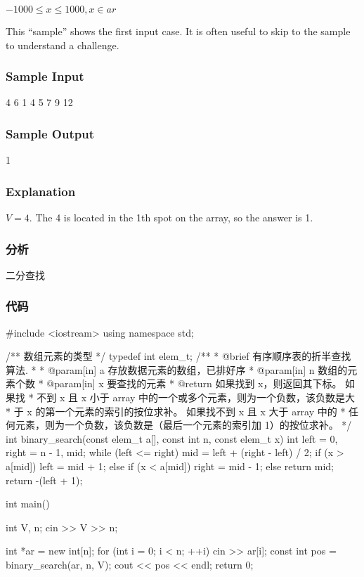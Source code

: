 $-1000 \leq x \leq 1000 , x \in ar$

{This “sample” shows the first input case. It is often useful to skip to the sample to understand a challenge. }


\subsubsection{Sample Input}
\begin{Code}
4
6
1 4 5 7 9 12
\end{Code}


\subsubsection{Sample Output}
\begin{Code}
1
\end{Code}


\subsubsection{Explanation}
$V = 4$. The 4 is located in the 1th spot on the array, so the answer is 1.


\subsubsection{分析}
二分查找


\subsubsection{代码}
\begin{Code}
#include <iostream>
using namespace std;

/** 数组元素的类型 */
typedef int elem_t;
/**
* @brief 有序顺序表的折半查找算法.
*
* @param[in] a 存放数据元素的数组，已排好序
* @param[in] n 数组的元素个数
* @param[in] x 要查找的元素
* @return 如果找到 x，则返回其下标。 如果找
* 不到 x 且 x 小于 array 中的一个或多个元素，则为一个负数，该负数是大
* 于 x 的第一个元素的索引的按位求补。 如果找不到 x 且 x 大于 array 中的
* 任何元素，则为一个负数，该负数是（最后一个元素的索引加 1）的按位求补。
*/
int binary_search(const elem_t a[], const int n, const elem_t x) {
    int left = 0, right = n - 1, mid;
    while (left <= right) {
        mid = left + (right - left) / 2;
        if (x > a[mid]) {
            left = mid + 1;
        }
        else if (x < a[mid]) {
            right = mid - 1;
        }
        else {
            return mid;
        }
    }
    return -(left + 1);
}


int main() {
    int V, n;
    cin >> V >> n;

    int *ar = new int[n];
    for (int i = 0; i < n; ++i)
        cin >> ar[i];
    const int pos = binary_search(ar, n, V);
    cout << pos << endl;
    return 0;
}
\end{Code}


